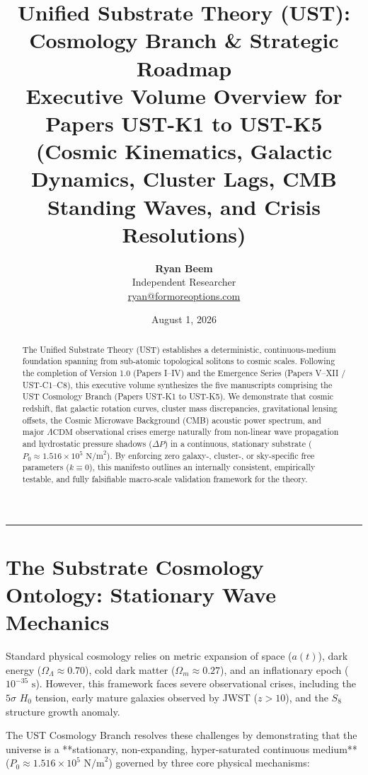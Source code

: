 \documentclass[11pt,a4paper]{article}
\title{\Large\bfseries Unified Substrate Theory (UST):\\Cosmology Branch \& Strategic Roadmap\\[0.3em]
	\large Executive Volume Overview for Papers UST-K1 to UST-K5\\(Cosmic Kinematics, Galactic Dynamics, Cluster Lags, CMB Standing Waves, and Crisis Resolutions)}
\author{
	\textbf{Ryan Beem}\\[0.5em]
	\small Independent Researcher \\
	\small \href{mailto:ryan@formoreoptions.com}{ryan@formoreoptions.com}
}
\date{August 1, 2026}
\begin{document}
	
	\maketitle
	
	\begin{abstract}
		The Unified Substrate Theory (UST) establishes a deterministic, continuous-medium foundation spanning from sub-atomic topological solitons to cosmic scales. Following the completion of Version 1.0 (Papers I--IV) and the Emergence Series (Papers V--XII / UST-C1--C8), this executive volume synthesizes the five manuscripts comprising the UST Cosmology Branch (Papers UST-K1 to UST-K5). We demonstrate that cosmic redshift, flat galactic rotation curves, cluster mass discrepancies, gravitational lensing offsets, the Cosmic Microwave Background (CMB) acoustic power spectrum, and major $\Lambda\text{CDM}$ observational crises emerge naturally from non-linear wave propagation and hydrostatic pressure shadows ($\Delta P$) in a continuous, stationary substrate ($P_0 \approx 1.516 \times 10^5 \text{ N/m}^2$). By enforcing zero galaxy-, cluster-, or sky-specific free parameters ($k \equiv 0$), this manifesto outlines an internally consistent, empirically testable, and fully falsifiable macro-scale validation framework for the theory.
	\end{abstract}
	
	\vspace{1em}
	\hrule
	\vspace{1.5em}
	
	\section{The Substrate Cosmology Ontology: Stationary Wave Mechanics}
	\label{sec:cosmo_ontology}
	
	Standard physical cosmology relies on metric expansion of space ($a(t)$), dark energy ($\Omega_\Lambda \approx 0.70$), cold dark matter ($\Omega_m \approx 0.27$), and an inflationary epoch ($10^{-35}\text{ s}$). However, this framework faces severe observational crises, including the $5\sigma$ $H_0$ tension, early mature galaxies observed by JWST ($z > 10$), and the $S_8$ structure growth anomaly.
	
	The UST Cosmology Branch resolves these challenges by demonstrating that the universe is a **stationary, non-expanding, hyper-saturated continuous medium** ($P_0 \approx 1.516 \times 10^5 \text{ N/m}^2$) governed by three core physical mechanisms:
	
\end{document}
